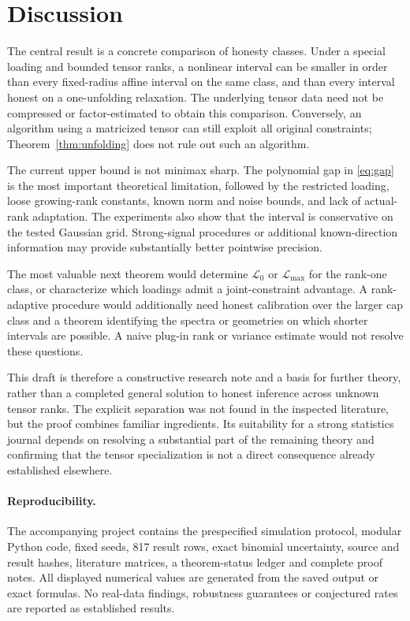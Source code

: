 \documentclass[11pt]{article}
\theoremstyle{remark}
\newcommand{\calL}{\mathcal L}
\begin{document}
\section{Discussion}\label{sec:discussion}

The central result is a concrete comparison of honesty classes. Under a special loading and bounded tensor ranks, a nonlinear interval can be smaller in order than every fixed-radius affine interval on the same class, and than every interval honest on a one-unfolding relaxation. The underlying tensor data need not be compressed or factor-estimated to obtain this comparison. Conversely, an algorithm using a matricized tensor can still exploit all original constraints; Theorem~\ref{thm:unfolding} does not rule out such an algorithm.

The current upper bound is not minimax sharp. The polynomial gap in \eqref{eq:gap} is the most important theoretical limitation, followed by the restricted loading, loose growing-rank constants, known norm and noise bounds, and lack of actual-rank adaptation. The experiments also show that the interval is conservative on the tested Gaussian grid. Strong-signal procedures or additional known-direction information may provide substantially better pointwise precision.

The most valuable next theorem would determine $\calL_0$ or $\calL_{\max}$ for the rank-one class, or characterize which loadings admit a joint-constraint advantage. A rank-adaptive procedure would additionally need honest calibration over the larger cap class and a theorem identifying the spectra or geometries on which shorter intervals are possible. A naive plug-in rank or variance estimate would not resolve these questions.

This draft is therefore a constructive research note and a basis for further theory, rather than a completed general solution to honest inference across unknown tensor ranks. The explicit separation was not found in the inspected literature, but the proof combines familiar ingredients. Its suitability for a strong statistics journal depends on resolving a substantial part of the remaining theory and confirming that the tensor specialization is not a direct consequence already established elsewhere.

\paragraph{Reproducibility.}
The accompanying project contains the prespecified simulation protocol, modular Python code, fixed seeds, 817 result rows, exact binomial uncertainty, source and result hashes, literature matrices, a theorem-status ledger and complete proof notes. All displayed numerical values are generated from the saved output or exact formulas. No real-data findings, robustness guarantees or conjectured rates are reported as established results.

\appendix



\end{document}

